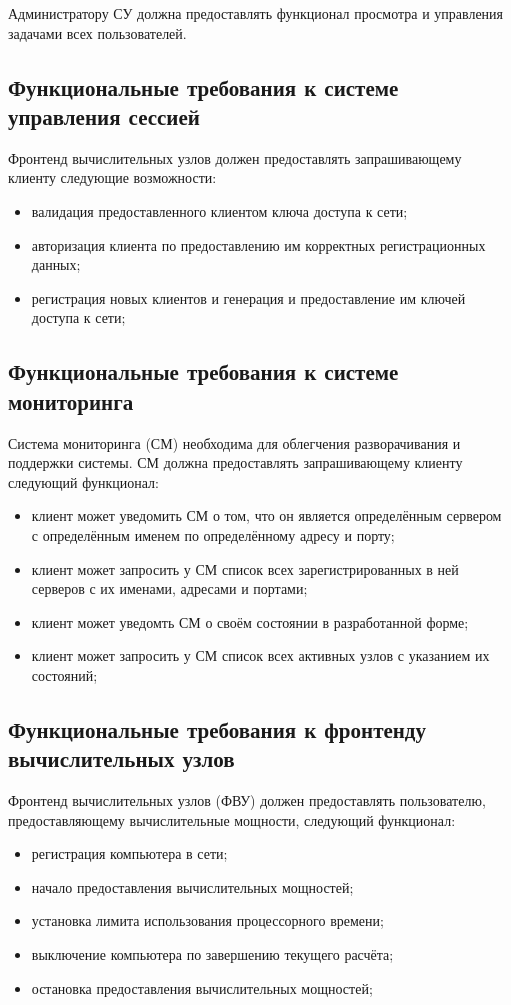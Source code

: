 \documentclass[a4paper,12pt]{report}
\numberwithin{equation}{section}
\begin{document}
Администратору СУ должна предоставлять функционал просмотра и управления задачами всех пользователей.

\subsection{Функциональные требования к системе управления сессией}
Фронтенд вычислительных узлов должен предоставлять запрашивающему клиенту следующие возможности:
\begin{itemize}
    \item валидация предоставленного клиентом ключа доступа к сети;
    \item авторизация клиента по предоставлению им корректных регистрационных данных;
    \item регистрация новых клиентов и генерация и предоставление им ключей доступа к сети;
\end{itemize}

\subsection{Функциональные требования к системе мониторинга}
Система мониторинга (СМ) необходима для облегчения разворачивания и поддержки системы.
СМ должна предоставлять запрашивающему клиенту следующий функционал:
\begin{itemize}
  \item клиент может уведомить СМ о том, что он является определённым сервером с определённым именем по определённому адресу и порту;
  \item клиент может запросить у СМ список всех зарегистрированных в ней серверов с их именами, адресами и портами;
  \item клиент может уведомть СМ о своём состоянии в разработанной форме;
  \item клиент может запросить у СМ список всех активных узлов с указанием их состояний;
\end{itemize}

\subsection{Функциональные требования к фронтенду вычислительных узлов}
Фронтенд вычислительных узлов (ФВУ) должен предоставлять пользователю, предоставляющему вычислительные мощности, следующий функционал:
\begin{itemize}
    \item регистрация компьютера в сети;
    \item начало предоставления вычислительных мощностей;
    \item установка лимита использования процессорного времени;
    \item выключение компьютера по завершению текущего расчёта;
    \item остановка предоставления вычислительных мощностей;
\end{itemize}
\end{document}
